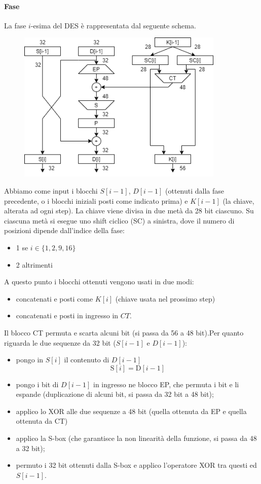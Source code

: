 \paragraph{Fase} La fase $i$-esima del DES è rappresentata dal seguente schema.
\begin{figure}[H]
    \centering
    \includegraphics[width = 280pt]{images/DES_2.png}
\end{figure}
\noindent Abbiamo come input i blocchi $S[i-1]$, $D[i-1]$ (ottenuti dalla fase precedente, o i blocchi iniziali posti come indicato prima) e $K[i-1]$ (la chiave, alterata ad ogni step). La chiave viene divisa in due metà da 28 bit ciascuno. Su ciascuna metà si esegue uno shift ciclico (SC) a sinistra, dove il numero di posizioni dipende dall'indice della fase:
\begin{itemize}
	\item 1 se $i \in \{1, 2, 9, 16\}$
	\item 2 altrimenti
\end{itemize}
A questo punto i blocchi ottenuti vengono usati in due modi:
\begin{itemize}
	\item concatenati e posti come $K[i]$ (chiave usata nel prossimo step)
	\item concatenati e posti in ingresso in $CT$.
\end{itemize}
Il blocco CT permuta e scarta alcuni bit (si passa da 56 a 48 bit).Per quanto riguarda le due sequenze da 32 bit ($S[i-1]$ e $D[i-1]$):
\begin{itemize}
	\item pongo in $S[i]$ il contenuto di $D[i-1]$
	$$\text{S}[i]=\text{D}[i-1]$$
	\item pongo i bit di $D[i-1]$ in ingresso ne blocco EP, che permuta i bit e li espande (duplicazione di alcuni bit, si passa da 32 bit a 48 bit);
	\item applico lo XOR alle due sequenze a 48 bit (quella ottenuta da EP e quella ottenuta da CT)
	\item applico la S-box (che garantisce la non linearità della funzione, si passa da 48 a 32 bit);
	\item permuto i 32 bit ottenuti dalla S-box e applico l'operatore XOR tra questi ed $S[i-1]$.
\end{itemize}

